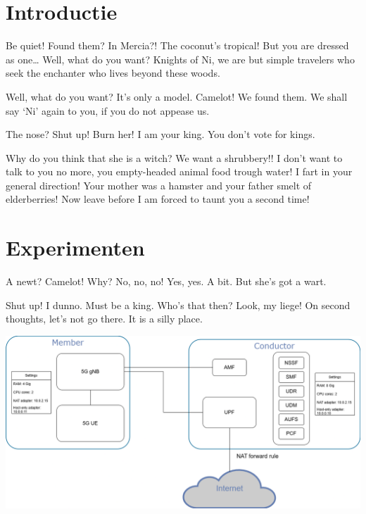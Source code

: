 \documentclass[a0,portrait]{hogent-poster}
\begin{document}
\begin{multicols}{2} %

\section{Introductie}

Be quiet! Found them? In Mercia?! The coconut's tropical! But you are dressed as one… Well, what do you want? Knights of Ni, we are but simple travelers who seek the enchanter who lives beyond these woods.

Well, what do you want? It's only a model. Camelot! We found them. We shall say `Ni' again to you, if you do not appease us.

The nose? Shut up! Burn her! I am your king. You don't vote for kings.

Why do you think that she is a witch? We want a shrubbery!! I don't want to talk to you no more, you empty-headed animal food trough water! I fart in your general direction! Your mother was a hamster and your father smelt of elderberries! Now leave before I am forced to taunt you a second time!

\section{Experimenten}

A newt? Camelot! Why? No, no, no! Yes, yes. A bit. But she's got a wart.

Shut up! I dunno. Must be a king. Who's that then? Look, my liege! On second thoughts, let's not go there. It is a silly place.


\begin{center}
  \captionsetup{type=figure}
  \includegraphics[width=1.0\linewidth]{./graphics/POC-setup.png}
\end{center}



\end{multicols}
\end{document}
